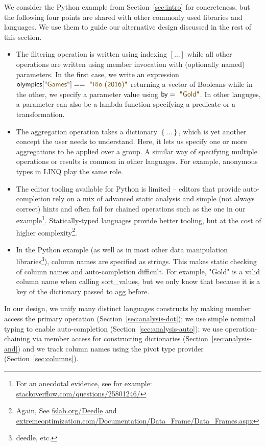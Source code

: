 \documentclass[a4paper,UKenglish]{lipics-v2016}
\theoremstyle{plain}
\theoremstyle{definition}
\newcommand{\str}[1]{\textnormal{\textcolor{strclr}{\sffamily "#1"}}}
\newcommand{\ident}[1]{\textnormal{\sffamily #1}}
\begin{document}
We consider the Python example from Section~\ref{sec:intro} for concreteness, but the following 
four points are shared with other commonly used libraries and languages. We use them to guide our
alternative design discussed in the rest of this section.

\begin{itemize}
\item The filtering operation is written using indexing $[\ldots]$ while all other operations are
  written using member invocation with (optionally named) parameters. In the first case, we write
  an expression $\ident{olympics}[\str{Games}]==\str{Rio (2016)}$ returning a vector of Booleans
  while in the other, we specify a parameter value using $\ident{by}=\str{Gold}$. In other languges,
  a parameter can also be a lambda function specifying a predicate or a transformation.
  
\item The aggregation operation takes a dictionary $\left\{\ldots\right\}$, which is yet another
  concept the user needs to understand. Here, it lets us specify one or more aggregations to
  be applied over a group. A similar way of specifying multiple operations or results is common 
  in other languages. For example, anonymous types in LINQ play the same role.
      
\item The editor tooling available for Python is limited -- editors that provide auto-completion
  rely on a mix of advanced static analysis and simple (not always correct) hints and often fail
  for chained operations such as the one in our example\footnote{For an anecdotal evidence,
  see for example: \url{stackoverflow.com/questions/25801246/}}. Statically-typed languages
  provide better tooling, but at the cost of higher complexity\footnote{Again,
  See \url{fslab.org/Deedle}
  and \url{extremeoptimization.com/Documentation/Data_Frame/Data_Frames.aspx} }.

\item In the Python example (as well as in most other data manipulation 
  libraries\footnote{deedle, etc.}), column names are specified as strings. This makes static 
  checking of column names and auto-completion difficult. For example, \str{Gold} is a valid 
  column name when calling \ident{sort\_values}, but we only know that because it is a key of the 
  dictionary passed to \ident{agg} before.
\end{itemize}

\noindent
In our design, we unify many distinct languages constructs by making member
access the primary operation (Section~\ref{sec:analysis-dot}); we use simple nominal typing to
enable auto-completion (Section~\ref{sec:analysis-auto}); we use operation-chaining via member access
for constructing dictionaries (Section~\ref{sec:analysis-and}) and we track column names using the 
pivot type provider (Section~\ref{sec:columns}).
\end{document}
